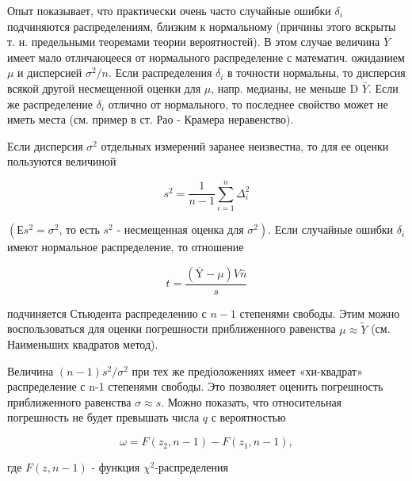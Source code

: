 \documentclass[10pt]{article}
\begin{document}
Опыт показывает, что практически очень часто случайные ошибки $\delta_{i}$ подчиняются распределениям, близким к нормальному (причины этого вскрыты т. н. предельными теоремами теории вероятностей). В этом случае величина $\bar{Y}$ имеет мало отличаюцееся от нормального распределение с математич. ожиданием $\mu$ и дисперсией $\sigma^{2} / n$. Если распределения $\delta_{i}$ в точности нормальны, то дисперсия всякой другой несмещенной оценки для $\mu$, напр. медианы, не меньше D $\bar{Y}$. Если же распределение $\delta_{i}$ отлично от нормального, то последнее свойство может не иметь места (см. пример в ст. Рао - Крамера неравенство).



Если дисперсия $\sigma^{2}$ отдельных измерений заранее неизвестна, то для ее оценки пользуются величиной



\[

s^{2}=\frac{1}{n-1} \sum_{i=1}^{n} \Delta_{i}^{2}

\]



$\left(Е s^{2}=\sigma^{2}\right.$, то есть $s^{2}$ - несмещенная оценка для $\left.\sigma^{2}\right)$. Если случайные ошибки $\delta_{i}$ имеют нормальное распределение, то отношение



\[

t=\frac{(\overline{\mathrm{Y}}-\mu) V \bar{n}}{s}

\]



подчиняется Стьюдента распределению с $n-1$ степенями свободы. Этим можно воспользоваться для оценки погрешности приближенного равенства $\mu \approx \tilde{Y}$ (см. Наименьших квадратов метод).



Величина $(n-1) s^{2} / \sigma^{2}$ при тех же предіоложениях имеет «хи-квадрат» распределение с n-1 степенями свободы. Это позволяет оценить погрешность приближенного равенства $\sigma \approx s$. Можно показать, что относительная погрешность не будет превышать числа $q$ с вероятностью



\[

\omega=F\left(z_{2}, n-1\right)-F\left(z_{1}, n-1\right),

\]



где $F(z, n-1)$ - функция $\chi^{2}$-распределения
\end{document}
